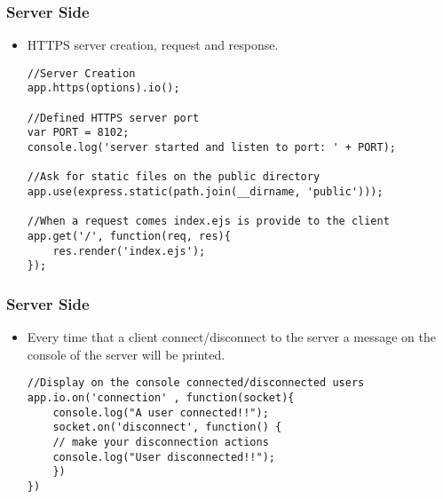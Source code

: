 \begin{frame}[fragile]\frametitle{Server Side}
\begin{itemize}

\item HTTPS server creation, request and response.
\begin{lstlisting}[style=JavaScript]
//Server Creation
app.https(options).io();

//Defined HTTPS server port
var PORT = 8102; 
console.log('server started and listen to port: ' + PORT);

//Ask for static files on the public directory
app.use(express.static(path.join(__dirname, 'public')));

//When a request comes index.ejs is provide to the client
app.get('/', function(req, res){ 
    res.render('index.ejs');
});
\end{lstlisting}
\end{itemize}
\end{frame}

\begin{frame}[fragile]\frametitle{Server Side}
\begin{itemize}
 \item Every time that a client connect/disconnect to the server a message on the console of the server
will be printed.
\begin{lstlisting}[style=JavaScript]
//Display on the console connected/disconnected users
app.io.on('connection' , function(socket){
    console.log("A user connected!!");
    socket.on('disconnect', function() {
    // make your disconnection actions
    console.log("User disconnected!!");
    })
})
\end{lstlisting}
\end{itemize}
\end{frame}

